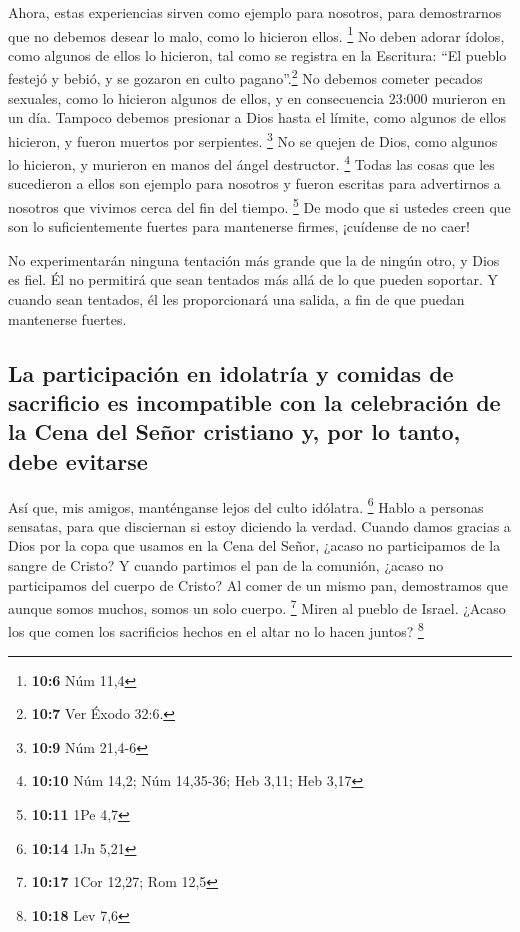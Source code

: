  Ahora, estas experiencias sirven como ejemplo para
nosotros, para demostrarnos que no debemos desear lo malo, como lo
hicieron ellos. \footnote{\textbf{10:6} Núm 11,4}  No
deben adorar ídolos, como algunos de ellos lo hicieron, tal como se
registra en la Escritura: ``El pueblo festejó y bebió, y se gozaron en
culto pagano''.\footnote{\textbf{10:7} Ver Éxodo 32:6.} 
No debemos cometer pecados sexuales, como lo hicieron algunos de ellos,
y en consecuencia 23:000 murieron en un día.  Tampoco
debemos presionar a Dios hasta el límite, como algunos de ellos
hicieron, y fueron muertos por serpientes. \footnote{\textbf{10:9} Núm
  21,4-6}  No se quejen de Dios, como algunos lo
hicieron, y murieron en manos del ángel destructor. \footnote{\textbf{10:10}
  Núm 14,2; Núm 14,35-36; Heb 3,11; Heb 3,17}  Todas las
cosas que les sucedieron a ellos son ejemplo para nosotros y fueron
escritas para advertirnos a nosotros que vivimos cerca del fin del
tiempo. \footnote{\textbf{10:11} 1Pe 4,7}  De modo que si
ustedes creen que son lo suficientemente fuertes para mantenerse firmes,
¡cuídense de no caer!

 No experimentarán ninguna tentación más grande que la de
ningún otro, y Dios es fiel. Él no permitirá que sean tentados más allá
de lo que pueden soportar. Y cuando sean tentados, él les proporcionará
una salida, a fin de que puedan mantenerse fuertes.

\hypertarget{la-participaciuxf3n-en-idolatruxeda-y-comidas-de-sacrificio-es-incompatible-con-la-celebraciuxf3n-de-la-cena-del-seuxf1or-cristiano-y-por-lo-tanto-debe-evitarse}{%
\subsection{La participación en idolatría y comidas de sacrificio es
incompatible con la celebración de la Cena del Señor cristiano y, por lo
tanto, debe
evitarse}\label{la-participaciuxf3n-en-idolatruxeda-y-comidas-de-sacrificio-es-incompatible-con-la-celebraciuxf3n-de-la-cena-del-seuxf1or-cristiano-y-por-lo-tanto-debe-evitarse}}

 Así que, mis amigos, manténganse lejos del culto
idólatra. \footnote{\textbf{10:14} 1Jn 5,21}  Hablo a
personas sensatas, para que disciernan si estoy diciendo la verdad.
 Cuando damos gracias a Dios por la copa que usamos en la
Cena del Señor, ¿acaso no participamos de la sangre de Cristo? Y cuando
partimos el pan de la comunión, ¿acaso no participamos del cuerpo de
Cristo?  Al comer de un mismo pan, demostramos que aunque
somos muchos, somos un solo cuerpo. \footnote{\textbf{10:17} 1Cor 12,27;
  Rom 12,5}  Miren al pueblo de Israel. ¿Acaso los que
comen los sacrificios hechos en el altar no lo hacen juntos? \footnote{\textbf{10:18}
  Lev 7,6}

